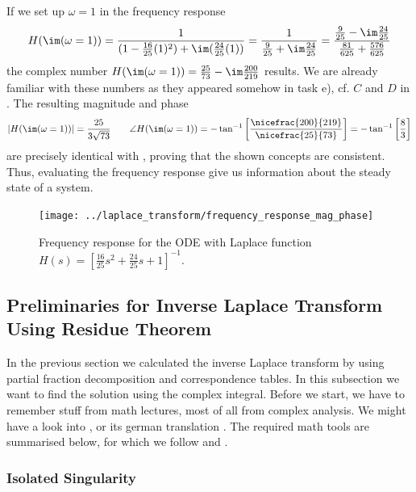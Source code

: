 If we set up $\omega=1$ in the frequency response
\begin{align}
H(\im(\omega=1))
= \frac{1}{ (1 -\frac{16}{25} (1)^2) + \im (\frac{24}{25} (1))}
= \frac{1}{ \frac{9}{25} + \im \frac{24}{25}}
= \frac{\frac{9}{25} - \im \frac{24}{25}}{ \frac{81}{625} + \frac{576}{625}}
\end{align}
the complex number $H(\im(\omega=1)) = \frac{25}{73} - \im \frac{200}{219}$ results.
%
We are already familiar with these numbers as they appeared somehow in task e), cf.
$C$ and $D$ in .
%
The resulting magnitude and phase
\begin{equation}
|H(\im(\omega=1))| = \frac{25}{3 \sqrt{73}}
\qquad
\angle H(\im(\omega=1)) = -\tan^{-1}
\left[\frac{\nicefrac{200}{219}}{\nicefrac{25}{73}}\right]
= -\tan^{-1}\left[\frac{8}{3}\right]
\end{equation}
are precisely identical with ,
proving that the shown concepts are consistent.
%
Thus, evaluating the frequency response give us information about the steady
state of a system.
%
\begin{figure}[h!]
\centering
\texttt{[image: ../laplace\_transform/frequency\_response\_mag\_phase]}
\caption{Frequency response for the ODE with Laplace function
$H(s) = \left[ \frac{16}{25} s^2 + \frac{24}{25} s + 1 \right]^{-1}$.}
\label{fig:frequency_response_mag_phase}
\end{figure}
\newpage
\subsection{Preliminaries for Inverse Laplace Transform Using Residue Theorem}
\label{sec:PrelimResidueTheorem}
%
%
In the previous section we calculated the inverse Laplace transform by using partial fraction decomposition and correspondence tables. In this subsection we want to find the solution using the complex integral.
Before we start, we have to remember stuff from math lectures, most of all from complex analysis.
%
We might have a look into \cite{Strang2007}, or its german translation \cite{Strang2010}.
%
The required math tools are summarised below, for which we follow \cite{Fritzsche2019} and \cite{UlrichWeber2017}.

\subsubsection{Isolated Singularity}


